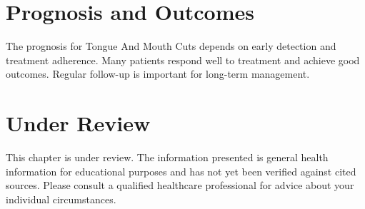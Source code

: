 \section*{Prognosis and Outcomes}
The prognosis for Tongue And Mouth Cuts depends on early detection and treatment adherence. Many patients respond well to treatment and achieve good outcomes. Regular follow-up is important for long-term management.
\section*{Under Review}
This chapter is under review. The information presented is general health information for educational purposes and has not yet been verified against cited sources. Please consult a qualified healthcare professional for advice about your individual circumstances.


\clearpage
